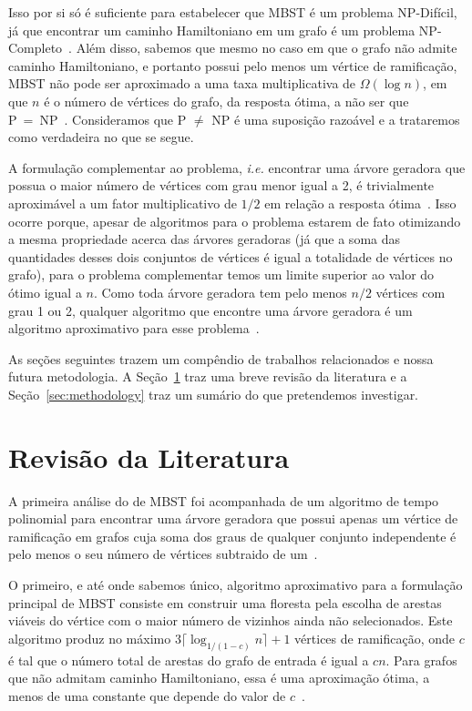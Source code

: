 \documentclass[conference]{IEEEtran}
\begin{document}
Isso por si só é suficiente para estabelecer que MBST é um problema NP-Difícil, já que encontrar um caminho Hamiltoniano em um grafo é um problema NP-Completo~\cite{karp1972}.
Além disso, sabemos que mesmo no caso em que o grafo não admite caminho Hamiltoniano, e portanto possui pelo menos um vértice de ramificação, MBST não pode ser aproximado a uma taxa multiplicativa de $\Omega(\log n)$, em que $n$ é o número de vértices do grafo, da resposta ótima, a não ser que P~=~NP~\cite{salamon2010}.
Consideramos que P $\neq$ NP é uma suposição razoável e a trataremos como verdadeira no que se segue.

A formulação complementar ao problema, \textit{i.e.} encontrar uma árvore geradora que possua o maior número de vértices com grau menor igual a 2, é trivialmente aproximável a um fator multiplicativo de $1/2$ em relação a resposta ótima~\cite{chimani2015}.
Isso ocorre porque, apesar de algoritmos para o problema estarem de fato otimizando a mesma propriedade acerca das árvores geradoras (já que a soma das quantidades desses dois conjuntos de vértices é igual a totalidade de vértices no grafo), para o problema complementar temos um limite superior ao valor do ótimo igual a $n$.
Como toda árvore geradora tem pelo menos $n/2$ vértices com grau 1 ou 2, qualquer algoritmo que encontre uma árvore geradora é um algoritmo aproximativo para esse problema~\cite{chimani2015}.

As seções seguintes trazem um compêndio de trabalhos relacionados e nossa futura metodologia.
A Seção~\ref{sec:review} traz uma breve revisão da literatura e a Seção~\ref{sec:methodology} traz um sumário do que pretendemos investigar.

\section{Revisão da Literatura} \label{sec:review}

A primeira análise do de MBST foi acompanhada de um algoritmo de tempo polinomial para encontrar uma árvore geradora que possui apenas um vértice de ramificação em grafos cuja soma dos graus de qualquer conjunto independente é pelo menos o seu número de vértices subtraido de um~\cite{gargano2004}.

O primeiro, e até onde sabemos único, algoritmo aproximativo para a formulação principal de MBST consiste em construir uma floresta pela escolha de arestas viáveis do vértice com o maior número de vizinhos ainda não selecionados.
Este algoritmo produz no máximo $3 \lceil \log_{1/(1 - c)} n \rceil + 1$ vértices de ramificação, onde $c$ é tal que o número total de arestas do grafo de entrada é igual a $cn$.
Para grafos que não admitam caminho Hamiltoniano, essa é uma aproximação ótima, a menos de uma constante que depende do valor de $c$~\cite{salamon2010}.
\end{document}
